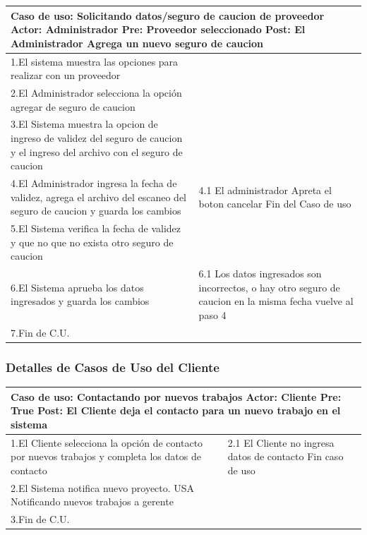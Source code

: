 \begin{longtable}{|p{}|p{}|}
    \hline
    \multicolumn{2}{|p{16cm}|}{
        \textbf{Caso de uso:} Solicitando datos/seguro de caucion de proveedor\newline
        \textbf{Actor:} Administrador\newline
        \textbf{Pre:} Proveedor seleccionado\newline
        \textbf{Post:} El Administrador Agrega un nuevo seguro de caucion
    }\\
    \hline
    1.El sistema  muestra las opciones para realizar con un proveedor & \\
    \hline
    2.El Administrador selecciona la opción agregar de seguro de caucion& \\
    \hline
    3.El Sistema muestra la opcion de ingreso de validez del seguro de caucion y el ingreso del archivo con el seguro de caucion&  \\
    \hline
    4.El Administrador ingresa la fecha de validez, agrega el archivo del escaneo del seguro de caucion y guarda los cambios&4.1 El administrador Apreta el boton cancelar \newline 4.2 Fin del Caso de uso \\
    \hline
    5.El Sistema verifica la fecha de validez y que no que no exista otro seguro de caucion & \\
    \hline
    6.El Sistema aprueba los datos ingresados y guarda los cambios &6.1 Los datos ingresados son incorrectos, o hay otro seguro de caucion en la misma fecha  \newline 6.2 vuelve al paso 4\\
    \hline
    7.Fin de C.U.& \\
    \hline
\end{longtable}


\subsubsection{Detalles de Casos de Uso del Cliente}
\begin{longtable}{|p{}|p{}|}
    \hline
    \multicolumn{2}{|p{16cm}|}{
        \textbf{Caso de uso:} Contactando por nuevos trabajos\newline
        \textbf{Actor:} Cliente\newline
        \textbf{Pre: }  True\newline
        \textbf{Post:} El Cliente deja el contacto para un nuevo trabajo en el sistema
    }\\
    \hline
    1.El Cliente selecciona la opción de contacto por nuevos trabajos y completa los datos de contacto&2.1 El Cliente no ingresa datos de contacto\newline 1.2 Fin caso de uso   \\
    \hline
    2.El Sistema notifica nuevo proyecto. USA Notificando nuevos trabajos a gerente& \\
    \hline
    3.Fin de C.U.& \\
    \hline
\end{longtable}


